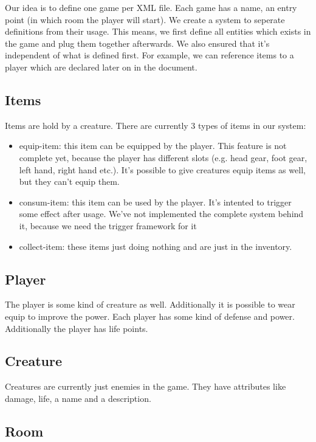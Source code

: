         


Our idea is to define one game per XML file. Each game has a name, an entry point (in which room the player will start). We create a system to seperate definitions from their usage. This means, we first define all entities which exists in the game and plug them together afterwards. We also ensured that it's independent of what is defined first. For example, we can reference items to a player which are declared later on in the document.

\subsection{Items}

Items are hold by a creature. There are currently 3 types of items in our system:

\begin{itemize}
\item equip-item: this item can be equipped by the player. This feature is not complete yet, because the player has different slots (e.g. head gear, foot gear, left hand, right hand etc.). It's possible to give creatures equip items as well, but they can't equip them.
\item consum-item: this item can be used by the player. It's intented to trigger some effect after usage. We've not implemented the complete system behind it, because we need the trigger framework for it
\item collect-item: these items just doing nothing and are just in the inventory. 
\end{itemize}

\subsection{Player}

The player is some kind of creature as well. Additionally it is possible to wear equip to improve the power. Each player has some kind of defense and power. Additionally the player has life points.

\subsection{Creature}

Creatures are currently just enemies in the game. They have attributes like damage, life, a name and a description.

\subsection{Room}

